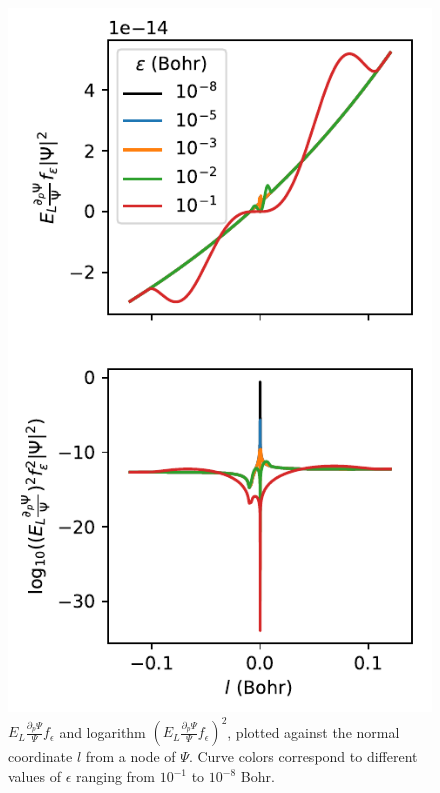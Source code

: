 \documentclass[twocolumn]{revtex4-1}
\begin{document}
\begin{figure}
\includegraphics[width=1.0\columnwidth]{../2_plots/viznode.pdf}
\caption{$E_L\frac{\partial_p \Psi}{\Psi} f_\epsilon$ and logarithm $(E_L\frac{\partial_p \Psi}{\Psi} f_\epsilon)^2$, plotted against the normal coordinate $l$ from a node of $\Psi$. Curve colors correspond to different values of $\epsilon$ ranging from $10^{-1}$ to $10^{-8}$ Bohr.}
\end{figure}
\end{document}
